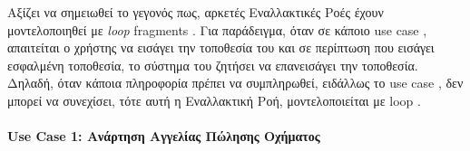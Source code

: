 \documentclass{../ol-softwaremanual}
\begin{document}
	Αξίζει να σημειωθεί το γεγονός πως, αρκετές Εναλλακτικές Ροές έχουν μοντελοποιηθεί με \en \textit{loop} fragments \gr. Για παράδειγμα, όταν σε κάποιο \en use case \gr, απαιτείται ο χρήστης να εισάγει την τοποθεσία του και σε περίπτωση που εισάγει εσφαλμένη τοποθεσία, το σύστημα του ζητήσει να επανεισάγει την τοποθεσία. Δηλαδή, όταν κάποια πληροφορία πρέπει να συμπληρωθεί, ειδάλλως το \en use case \gr, δεν μπορεί να συνεχίσει, τότε αυτή η Εναλλακτική Ροή, μοντελοποιείται με \en loop \gr.
	
	
	\newpage
	
	\paragraph{\en Use Case 1: \gr Ανάρτηση Αγγελίας Πώλησης Οχήματος}
	\centering
	
\end{document}
